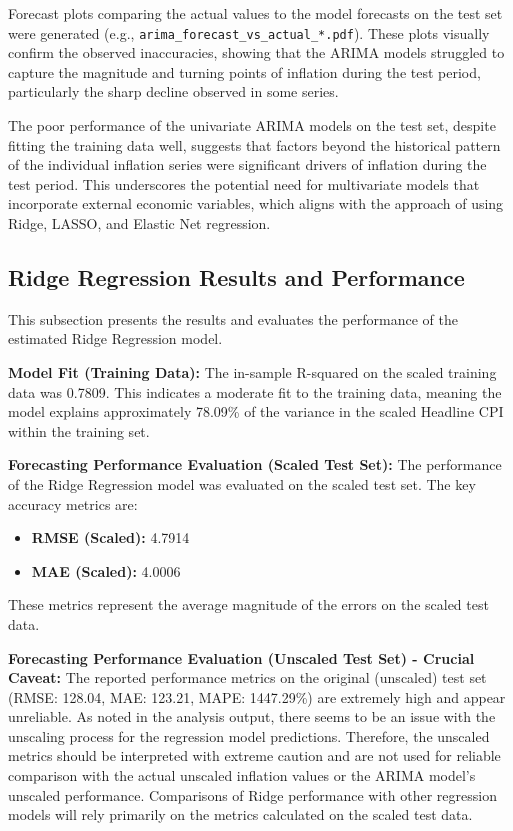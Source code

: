 \documentclass[12pt,a4paper]{article}
\begin{document}
Forecast plots comparing the actual values to the model forecasts on the test set were generated (e.g., \texttt{arima\_forecast\_vs\_actual\_*.pdf}). These plots visually confirm the observed inaccuracies, showing that the ARIMA models struggled to capture the magnitude and turning points of inflation during the test period, particularly the sharp decline observed in some series.

The poor performance of the univariate ARIMA models on the test set, despite fitting the training data well, suggests that factors beyond the historical pattern of the individual inflation series were significant drivers of inflation during the test period. This underscores the potential need for multivariate models that incorporate external economic variables, which aligns with the approach of using Ridge, LASSO, and Elastic Net regression.

\subsection{Ridge Regression Results and Performance}

This subsection presents the results and evaluates the performance of the estimated Ridge Regression model.

\textbf{Model Fit (Training Data):}
The in-sample R-squared on the scaled training data was 0.7809. This indicates a moderate fit to the training data, meaning the model explains approximately 78.09\% of the variance in the scaled Headline CPI within the training set.

\textbf{Forecasting Performance Evaluation (Scaled Test Set):}
The performance of the Ridge Regression model was evaluated on the scaled test set. The key accuracy metrics are:
\begin{itemize}
    \item \textbf{RMSE (Scaled):} 4.7914
    \item \textbf{MAE (Scaled):} 4.0006
\end{itemize}
These metrics represent the average magnitude of the errors on the scaled test data.

\textbf{Forecasting Performance Evaluation (Unscaled Test Set) - Crucial Caveat:}
The reported performance metrics on the original (unscaled) test set (RMSE: 128.04, MAE: 123.21, MAPE: 1447.29\%) are extremely high and appear unreliable. As noted in the analysis output, there seems to be an issue with the unscaling process for the regression model predictions. Therefore, the unscaled metrics should be interpreted with extreme caution and are not used for reliable comparison with the actual unscaled inflation values or the ARIMA model's unscaled performance. Comparisons of Ridge performance with other regression models will rely primarily on the metrics calculated on the scaled test data.
\end{document}
